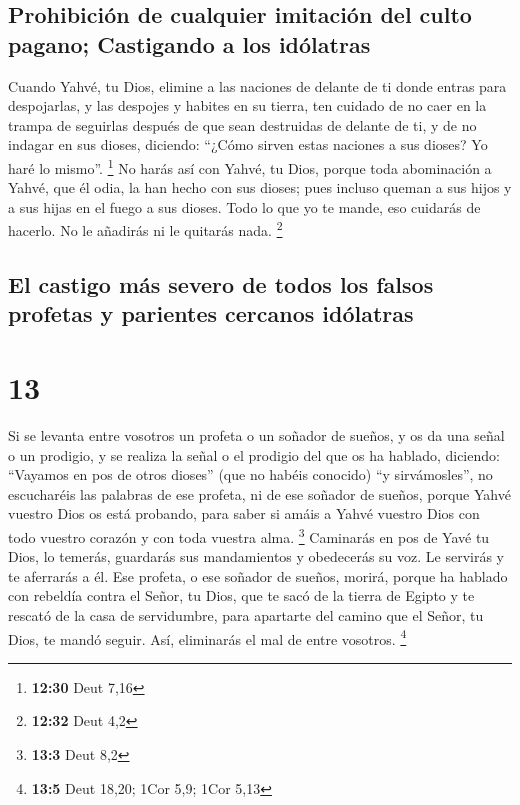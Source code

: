 \hypertarget{prohibiciuxf3n-de-cualquier-imitaciuxf3n-del-culto-pagano-castigando-a-los-iduxf3latras}{%
\subsection{Prohibición de cualquier imitación del culto pagano;
Castigando a los
idólatras}\label{prohibiciuxf3n-de-cualquier-imitaciuxf3n-del-culto-pagano-castigando-a-los-iduxf3latras}}

 Cuando Yahvé, tu Dios, elimine a las naciones de delante
de ti donde entras para despojarlas, y las despojes y habites en su
tierra,  ten cuidado de no caer en la trampa de seguirlas
después de que sean destruidas de delante de ti, y de no indagar en sus
dioses, diciendo: ``¿Cómo sirven estas naciones a sus dioses? Yo haré lo
mismo''. \footnote{\textbf{12:30} Deut 7,16}  No harás
así con Yahvé, tu Dios, porque toda abominación a Yahvé, que él odia, la
han hecho con sus dioses; pues incluso queman a sus hijos y a sus hijas
en el fuego a sus dioses.  Todo lo que yo te mande, eso
cuidarás de hacerlo. No le añadirás ni le quitarás nada. \footnote{\textbf{12:32}
  Deut 4,2}

\hypertarget{el-castigo-muxe1s-severo-de-todos-los-falsos-profetas-y-parientes-cercanos-iduxf3latras}{%
\subsection{El castigo más severo de todos los falsos profetas y
parientes cercanos
idólatras}\label{el-castigo-muxe1s-severo-de-todos-los-falsos-profetas-y-parientes-cercanos-iduxf3latras}}

\hypertarget{section-12}{%
\section{13}\label{section-12}}

 Si se levanta entre vosotros un profeta o un soñador de
sueños, y os da una señal o un prodigio,  y se realiza la
señal o el prodigio del que os ha hablado, diciendo: ``Vayamos en pos de
otros dioses'' (que no habéis conocido) ``y sirvámosles'',
 no escucharéis las palabras de ese profeta, ni de ese
soñador de sueños, porque Yahvé vuestro Dios os está probando, para
saber si amáis a Yahvé vuestro Dios con todo vuestro corazón y con toda
vuestra alma. \footnote{\textbf{13:3} Deut 8,2}  Caminarás
en pos de Yavé tu Dios, lo temerás, guardarás sus mandamientos y
obedecerás su voz. Le servirás y te aferrarás a él.  Ese
profeta, o ese soñador de sueños, morirá, porque ha hablado con rebeldía
contra el Señor, tu Dios, que te sacó de la tierra de Egipto y te
rescató de la casa de servidumbre, para apartarte del camino que el
Señor, tu Dios, te mandó seguir. Así, eliminarás el mal de entre
vosotros. \footnote{\textbf{13:5} Deut 18,20; 1Cor 5,9; 1Cor 5,13}

